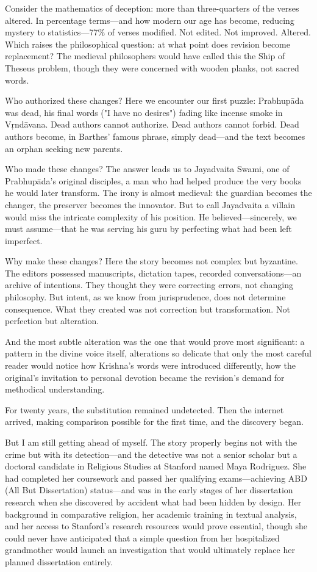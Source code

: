 \documentclass[12pt,twoside]{book}
\begin{document}
Consider the mathematics of deception: more than three-quarters of the verses altered. In percentage terms—and how modern our age has become, reducing mystery to statistics—77\% of verses modified. Not edited. Not improved. Altered. Which raises the philosophical question: at what point does revision become replacement? The medieval philosophers would have called this the Ship of Theseus problem, though they were concerned with wooden planks, not sacred words.

Who authorized these changes? Here we encounter our first puzzle: Prabhupāda was dead, his final words ("I have no desires") fading like incense smoke in Vṛndāvana. Dead authors cannot authorize. Dead authors cannot forbid. Dead authors become, in Barthes' famous phrase, simply dead—and the text becomes an orphan seeking new parents.

Who made these changes? The answer leads us to Jayadvaita Swami, one of Prabhupāda's original disciples, a man who had helped produce the very books he would later transform. The irony is almost medieval: the guardian becomes the changer, the preserver becomes the innovator. But to call Jayadvaita a villain would miss the intricate complexity of his position. He believed—sincerely, we must assume—that he was serving his guru by perfecting what had been left imperfect.

Why make these changes? Here the story becomes not complex but byzantine. The editors possessed manuscripts, dictation tapes, recorded conversations—an archive of intentions. They thought they were correcting errors, not changing philosophy. But intent, as we know from jurisprudence, does not determine consequence. What they created was not correction but transformation. Not perfection but alteration.

And the most subtle alteration was the one that would prove most significant: a pattern in the divine voice itself, alterations so delicate that only the most careful reader would notice how Krishna's words were introduced differently, how the original's invitation to personal devotion became the revision's demand for methodical understanding.

For twenty years, the substitution remained undetected. Then the internet arrived, making comparison possible for the first time, and the discovery began.

But I am still getting ahead of myself. The story properly begins not with the crime but with its detection—and the detective was not a senior scholar but a doctoral candidate in Religious Studies at Stanford named Maya Rodriguez. She had completed her coursework and passed her qualifying exams—achieving ABD (All But Dissertation) status—and was in the early stages of her dissertation research when she discovered by accident what had been hidden by design. Her background in comparative religion, her academic training in textual analysis, and her access to Stanford's research resources would prove essential, though she could never have anticipated that a simple question from her hospitalized grandmother would launch an investigation that would ultimately replace her planned dissertation entirely.
\end{document}
